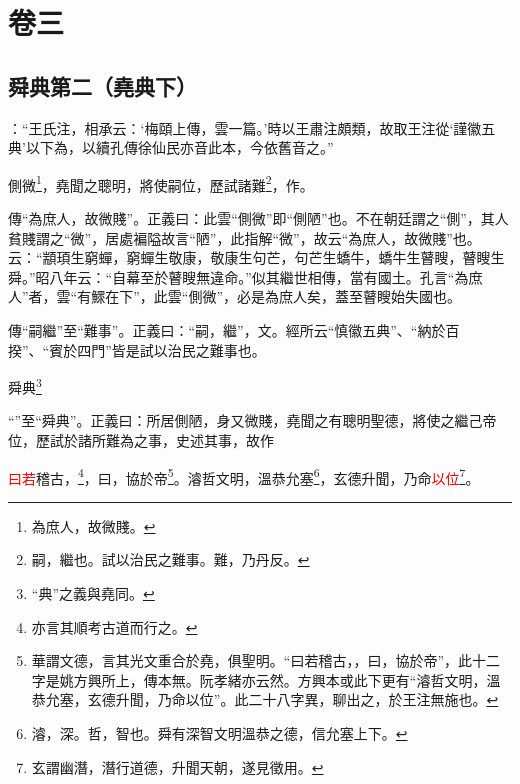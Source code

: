 

\chapter{卷三}


\section{舜典第二（堯典下）}


 {\noindent{}\fzbyks {}：“王氏注，相承云：‘梅頤上傳，雲一篇。’時以王肅注頗類，故取王注從‘謹徽五典’以下為，以續孔傳徐仙民亦音此本，今依舊音之。” \par}

\textcolor{red}{}側微\footnote{為庶人，故微賤。}，堯聞之聰明，將使嗣位，歷試諸難\footnote{嗣，繼也。試以治民之難事。難，乃丹反。}，作\CJKunderwave{\textcolor{red}{舜典}}。

{\noindent\zhuan{}\fzbyks 傳“為庶人，故微賤”。正義曰：此雲“側微”即“側陋”也。不在朝廷謂之“側”，其人貧賤謂之“微”，居處褊隘故言“陋”，此指解“微”，故云“為庶人，故微賤”也。云：“顓頊生窮蟬，窮蟬生敬康，敬康生句芒，句芒生蟜牛，蟜牛生瞽瞍，瞽瞍生舜。”昭八年云：“自幕至於瞽瞍無違命。”似其繼世相傳，當有國土。孔言“為庶人”者，雲“有鰥在下”，此雲“側微”，必是為庶人矣，蓋至瞽瞍始失國也。 \par}

{\noindent\zhuan{}\fzbyks 傳“嗣繼”至“難事”。正義曰：“嗣，繼”，文。經所云“慎徽五典”、“納於百揆”、“賓於四門”皆是試以治民之難事也。 \par}

舜典\footnote{“典”之義與堯同。}

{\noindent\shu{}\fzkt “”至“舜典”。正義曰：所居側陋，身又微賤，堯聞之有聰明聖德，將使之繼己帝位，歷試於諸所難為之事，史述其事，故作 \par}

\textcolor{red}{曰若}稽古，\footnote{亦言其順考古道而行之。}，曰，協於帝\footnote{華謂文德，言其光文重合於堯，俱聖明。“曰若稽古，，曰，協於帝”，此十二字是姚方興所上，傳本無。阮孝緒亦云然。方興本或此下更有“濬哲文明，溫恭允塞，玄德升聞，乃命以位”。此二十八字異，聊出之，於王注無施也。}。濬哲文明，溫恭允塞\footnote{濬，深。哲，智也。舜有深智文明溫恭之德，信允塞上下。}，玄德升聞，乃命\textcolor{red}{以位}\footnote{玄謂幽潛，潛行道德，升聞天朝，遂見徵用。}。

